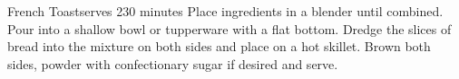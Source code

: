 \begin{recipe}{French Toast}{serves 2}{30 minutes}
 Place ingredients in a blender until combined.  Pour into a shallow bowl or tupperware with a flat bottom.  Dredge the slices of bread into the mixture on both sides and place on a hot skillet.  Brown both sides, powder with confectionary sugar if desired and serve.

\end{recipe}

